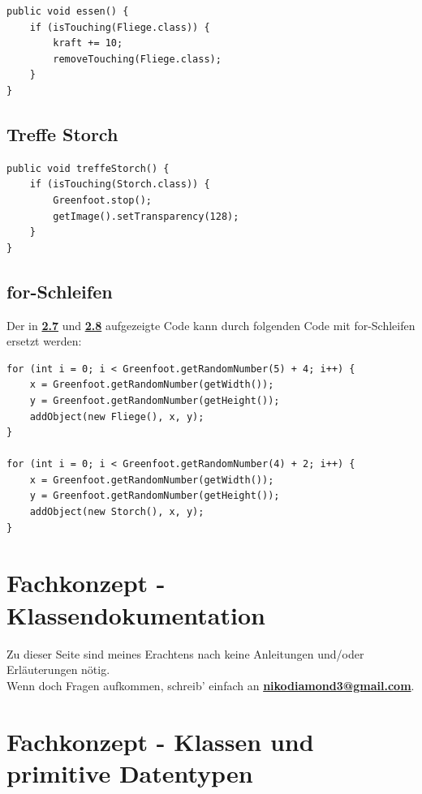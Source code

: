 \documentclass{scrartcl}   %
\begin{document}
\begin{lstlisting}
public void essen() {
    if (isTouching(Fliege.class)) {
        kraft += 10;
        removeTouching(Fliege.class);
    }
}
\end{lstlisting}

\subsection{Treffe Storch}

\begin{lstlisting}
public void treffeStorch() {
    if (isTouching(Storch.class)) {
        Greenfoot.stop();
        getImage().setTransparency(128);
    }
}
\end{lstlisting}

\newpage

\subsection{for-Schleifen}

Der in \hyperlink{subsection.2.7}{\textbf{2.7}} und \hyperlink{subsection.2.8}{\textbf{2.8}} aufgezeigte Code kann durch folgenden Code mit for-Schleifen ersetzt werden:\\
\begin{lstlisting}
for (int i = 0; i < Greenfoot.getRandomNumber(5) + 4; i++) {
    x = Greenfoot.getRandomNumber(getWidth());
    y = Greenfoot.getRandomNumber(getHeight());
    addObject(new Fliege(), x, y);
}
        
for (int i = 0; i < Greenfoot.getRandomNumber(4) + 2; i++) {
    x = Greenfoot.getRandomNumber(getWidth());
    y = Greenfoot.getRandomNumber(getHeight());
    addObject(new Storch(), x, y);
}
\end{lstlisting}

\newpage

\section{Fachkonzept - Klassendokumentation}

Zu dieser Seite sind meines Erachtens nach keine Anleitungen und/oder Erläuterungen nötig.\\
Wenn doch Fragen aufkommen, schreib' einfach an \textbf{\href{mailto:nikodiamond3@gmail.com}{nikodiamond3@gmail.com}}.

\newpage

\section{Fachkonzept - Klassen und primitive Datentypen}
\end{document}
